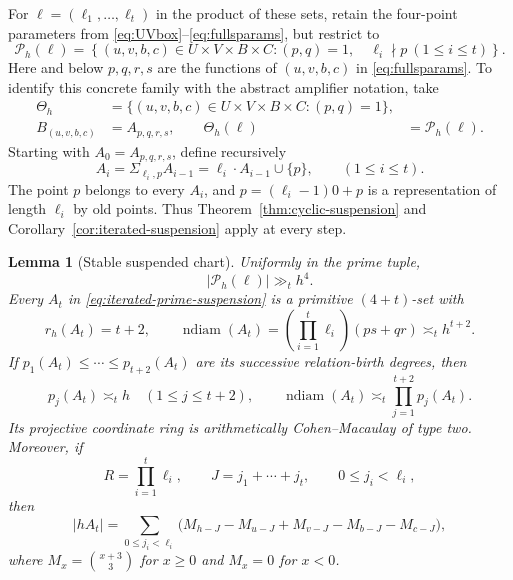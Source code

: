 \documentclass[11pt,reqno]{amsart}
\newtheorem{lemma}[theorem]{Lemma}
\theoremstyle{definition}
\theoremstyle{remark}
\newcommand{\ndiam}{\operatorname{ndiam}}
\begin{document}
For $\boldsymbol\ell=(\ell_1,\ldots,\ell_t)$ in the product of these
sets, retain the four-point parameters from
\eqref{eq:UVbox}--\eqref{eq:fullsparams}, but restrict to
\begin{equation}\label{eq:endpoint-parameter-set}
 \mathcal P_h(\boldsymbol\ell)=
 \left\{(u,v,b,c)\in U\times V\times B\times C:
  (p,q)=1,\quad \ell_i\nmid p\ (1\leq i\leq t)\right\}.
\end{equation}
Here and below $p,q,r,s$ are the functions of $(u,v,b,c)$ in
\eqref{eq:fullsparams}.  To identify this concrete family with the abstract
amplifier notation, take
\[
 \begin{aligned}
  \Theta_h
   &=\{(u,v,b,c)\in U\times V\times B\times C:(p,q)=1\},\\
  B_{(u,v,b,c)}&=A_{p,q,r,s},\qquad
  \Theta_h(\boldsymbol\ell)&=\mathcal P_h(\boldsymbol\ell).
 \end{aligned}
\]
Starting with $A_0=A_{p,q,r,s}$, define recursively
\begin{equation}\label{eq:iterated-prime-suspension}
 A_i=\Sigma_{\ell_i,p}A_{i-1}
 =\ell_i\mathbin{\cdot}A_{i-1}\cup\{p\},\qquad(1\leq i\leq t).
\end{equation}
The point $p$ belongs to every $A_i$, and
$p=(\ell_i-1)0+p$ is a representation of length $\ell_i$ by old points.
Thus Theorem~\ref{thm:cyclic-suspension} and
Corollary~\ref{cor:iterated-suspension} apply at every step.

\begin{lemma}[Stable suspended chart]
\label{lem:stable-suspended-chart}
Uniformly in the prime tuple,
\begin{equation}\label{eq:endpoint-parameter-count}
 |\mathcal P_h(\boldsymbol\ell)|\gg_t h^4.
\end{equation}
Every $A_t$ in \eqref{eq:iterated-prime-suspension} is a primitive
$(4+t)$-set with
\begin{equation}\label{eq:suspended-geometry}
 r_h(A_t)=t+2,\qquad
 \ndiam(A_t)=\left(\prod_{i=1}^t\ell_i\right)(ps+qr)
 \asymp_t h^{t+2}.
\end{equation}
If
$p_1(A_t)\leq\cdots\leq p_{t+2}(A_t)$ are its successive relation-birth
degrees, then
\begin{equation}\label{eq:endpoint-critical-birth-scales}
 p_j(A_t)\asymp_t h\quad(1\leq j\leq t+2),
 \qquad
 \ndiam(A_t)\asymp_t\prod_{j=1}^{t+2}p_j(A_t).
\end{equation}
Its projective coordinate ring is arithmetically Cohen--Macaulay of type two.
Moreover, if
\begin{equation}\label{eq:JRS-definitions}
 R=\prod_{i=1}^t\ell_i,\qquad
 J=j_1+\cdots+j_t,\qquad 0\leq j_i<\ell_i,
\end{equation}
then
\begin{equation}\label{eq:suspended-chart-convolution}
 |hA_t|=
 \sum_{0\leq j_i<\ell_i}
 \bigl(M_{h-J}-M_{u-J}+M_{v-J}-M_{b-J}-M_{c-J}\bigr),
\end{equation}
where $M_x=\binom{x+3}{3}$ for $x\geq0$ and $M_x=0$ for $x<0$.
\end{lemma}
\end{document}

